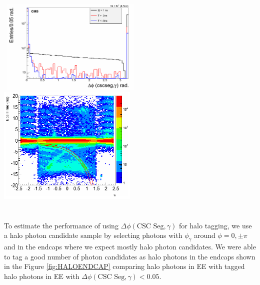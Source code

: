 \paragraph*{}\mbox{}\\
\begin{minipage}{\linewidth}  
\begin{center}
\centering
\mbox{
\includegraphics[height=0.45\textwidth, width=0.5\textwidth]{THESISPLOTS/CSC-Segment-Halo-Tagging.png}
\includegraphics[height=0.45\textwidth, width=0.5\textwidth]{THESISPLOTS/HALO-ECAL-TIME-Vs-ETA.png}}
\label{fig:HALO}
\end{center}
\end{minipage}

\paragraph*{}\mbox{}\\
To estimate the performance of using $\Delta\phi(\mbox{CSC Seg},\gamma)$ for halo tagging, we use a halo photon candidate sample by selecting photons with $\phi_{\gamma}$ around $\phi = 0, \pm \pi$ and in the endcaps where we expect mostly halo photon candidates.  We were able to tag a good number of photon candidates as halo photons in the endcaps shown in the Figure \ref{fig:HALOENDCAP} comparing halo photons in EE with tagged halo photons in EE  with $\Delta\phi(\mbox{CSC Seg},\gamma) < 0.05$.
